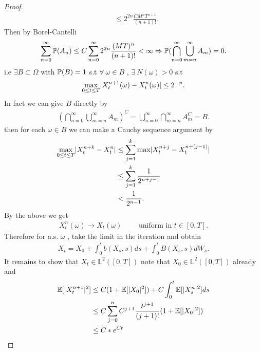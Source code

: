 \begin{proof}
\begin{align*}
                                                                      &\le 2^{2n} \frac{CM^{n}T^{n+1}  }{(n+1)!} 
  .\end{align*}
  Then by Borel-Cantelli
  \begin{align*}
    \sum_{n=0}^{\infty} \P(A_n) \le  C \sum_{n=0}^{\infty}2^{2n} \frac{(MT)^{n} }{(n+1)!}    <\infty \implies \P(\bigcap_{n=0}^{\infty} \bigcup_{m=n}^{\infty} A_m ) = 0
   .\end{align*}
   i.e $\exists  B \subset  \Omega  $ with $\P(B) = 1$ s.t $\forall \ \omega  \in  B$ , $\exists \ N(\omega ) > 0 $ s.t
   \begin{align*}
     \max_{0\le t\le T} \abs{X_t^{n+1}(\omega ) - X_t^{n}(\omega )} \le  2^{-n} 
   .\end{align*}
   In fact we can give $B$ directly by 
   \begin{align*}
     \left( \bigcap_{n=0}^{\infty} \bigcup_{m=n}^{\infty} A_m   \right)^{C} = \bigcup_{n=0}^{\infty} \bigcap_{m=n}^{\infty} A_m^{C} = B     
   .\end{align*}
   then for each $\omega  \in  B$  we can make a Cauchy sequence argument by
   \begin{align*}
     \max_{0\le t\le T} \abs{X_t^{n+k} - X^{n}_t } &\le  \sum_{j=1}^{k} \max \abs{X_t^{n+j} - X^{n+(j-1)}_t } \\
                                                   &\le \sum_{j=1}^{k} \frac{1}{2^{n+j-1} }\\
                                                   &< \frac{1}{2^{n-1} } 
   .\end{align*}
   By the above we get 
   \begin{align*}
     X_t^{n}(\omega ) \to X_t(\omega ) \qquad \text{ uniform in } t\in [0,T]
   .\end{align*}
   Therefore for a.s. $\omega $ , take the limit in the iteration  and obtain 
   \begin{align*}
    X_t = X_{0} + \int_0^{t} b(X_s,s) ds + \int_0^{t} B(X_s,s) dW_s  
   .\end{align*}
   It remains to show that $X_t \in  \mathbb{L}^2([0,T])$ note that $X_{0} \in  \mathbb{L}^2([0,T])$ already and 
   \begin{align*}
     \E[\abs{X_t^{n+1}}^2] &\le  C(1+\E[\abs{X_0}^2]) + C \int_0^{t} \E[\abs{X_s^{n} }^2] ds \\
                           &\le  C \sum_{j=0}^{n} C^{j+1} \frac{t^{j+1}}{(j+1)!} (1+\E[\abs{X_0}^2]) \\
                           &\le  C* e^{Ct} 

\end{align*}
\end{proof}
